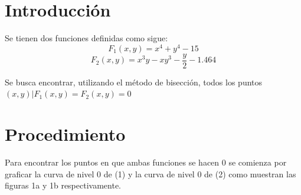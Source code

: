 \documentclass[a4paper, 11pt, spanish]{article}
\begin{document}
\clearpage


\newpage

\tableofcontents %
\listoffigures %
\listoftables %

\newpage

\section{Introducci\'on}
Se tienen dos funciones definidas como sigue:
\begin{equation}
	F_{1}(x,y) = x^{4} + y^{4} - 15
\end{equation}
\begin{equation}
	F_{2}(x,y) = x^{3}y - xy^{3} - \frac{y}{2} - 1.464
\end{equation}

Se busca encontrar, utilizando el m\'etodo de bisecci\'on, todos los puntos $(x,y) \vert F_{1}(x,y) = F_{2}(x,y) = 0$

\section{Procedimiento}
Para encontrar los puntos en que ambas funciones se hacen $0$ se comienza por graficar la curva de nivel $0$ de (1) y la curva de nivel $0$ de (2) como muestran las figuras 1a y 1b respectivamente.
\end{document}
